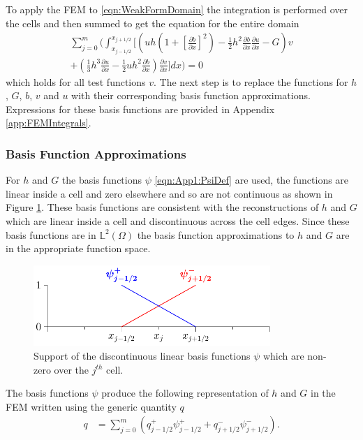 To apply the FEM to \eqref{eqn:WeakFormDomain} the integration is performed over the cells and then summed to get the equation for the entire domain
\begin{multline}
\label{eq:elementwiseint}
 \sum_{j=0}^m \Bigg(  \int_{x_{j-1/2} }^{{x_{j+1/2}}} \Bigg[  \left( uh \left(1 + \left[\frac{\partial b}{\partial x}\right]^2 \right)  - \frac{1}{2}h^2\frac{\partial b}{\partial x}  \frac{\partial u }{\partial x}  -  G \right) v   \\ +  \left(\frac{1}{3}h^3  \frac{\partial {u}}{\partial x}    -     \frac{1}{2} uh^2\frac{\partial b}{\partial x}    \right) \frac{\partial v }{\partial x} \Bigg]dx \Bigg)  = 0
\end{multline}
which holds for all test functions $v$. The next step is to replace the functions for $h$, $G$, $b$, $v$ and $u$ with their corresponding basis function approximations. Expressions for these basis functions are provided in Appendix \ref{app:FEMIntegrals}.

\subsubsection{Basis Function Approximations}
For $h$ and $G$ the basis functions $\psi$ \eqref{eqn:App1:PsiDef} are used, the functions are linear inside a cell and zero elsewhere and so are not continuous as shown in Figure \ref{fig:P1DiscBasis}. These basis functions are consistent with the reconstructions of $h$ and $G$ which are linear inside a cell and discontinuous across the cell edges. Since these basis functions are in $\mathbb{L}^2(\Omega)$ the basis function approximations to $h$ and $G$ are in the appropriate function space.
\begin{figure}
	\centering
	\includegraphics[width=0.8\textwidth]{./chp3/figures/P1.pdf}
	\caption{Support of the discontinuous linear basis functions $\psi$ which are non-zero over the $j^{th}$ cell.}
	\label{fig:P1DiscBasis}
\end{figure}

The basis functions $\psi$ produce the following representation of $h$ and $G$ in the FEM written using the generic quantity $q$
\begin{align}
\label{eqn:FEapproxtohG}
q &= \sum_{j=0}^m \left( q^+_{j-1/2}\psi^+_{j-1/2}  + q^-_{j+1/2}\psi^-_{j+1/2} \right).
\end{align}

